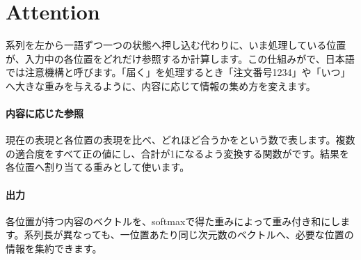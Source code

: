 \par
\endgroup


\section{Attention}
\label{sec:06-machine-learning-22}

系列を左から一語ずつ一つの状態へ押し込む代わりに、いま処理している位置が、入力中の各位置をどれだけ参照するか計算します。この仕組みがで、日本語では注意機構と呼びます。「届く」を処理するとき「注文番号1234」や「いつ」へ大きな重みを与えるように、内容に応じて情報の集め方を変えます。

\begingroup
\begingroup
      \centering
\par
\endgroup
\medskip
\begingroup
\paragraph{内容に応じた参照}
        現在の表現と各位置の表現を比べ、どれほど合うかをという数で表します。複数の適合度をすべて正の値にし、合計が1になるよう変換する関数がです。結果を各位置へ割り当てる重みとして使います。

\paragraph{出力}
        各位置が持つ内容のベクトルを、softmaxで得た重みによって重み付き和にします。系列長が異なっても、一位置あたり同じ次元数のベクトルへ、必要な位置の情報を集約できます。

\par
\endgroup
  \vspace{4mm}
\par
\endgroup


